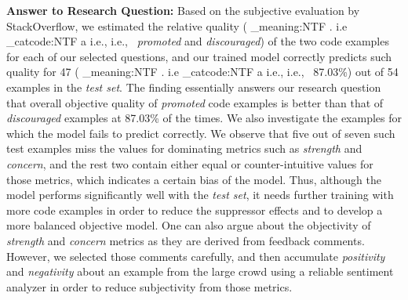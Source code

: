 \documentclass[conference]{IEEEtran}
\makeatletter
\newcommand\latinabbrev[1]{
  \peek_meaning:NTF . {%
    #1\@}%
  { \peek_catcode:NTF a {%
      #1., \@ }%
    {#1., \@}}}
\def\ie{\latinabbrev{i.e}}
\makeatother
\begin{document}
\textbf{Answer to Research Question:}
Based on the subjective evaluation by StackOverflow, we estimated the relative quality (\ie\ \emph{promoted} and \emph{discouraged}) of the two code examples for each of our selected questions, and our trained model correctly predicts such quality for 47 (\ie\ 87.03\%) out of 54 examples in the \emph{test set}.
The finding essentially answers our research question that overall objective quality of \emph{promoted} code examples is better than that of \emph{discouraged} examples at 87.03\% of the times.
We also investigate the examples for which the model fails to predict correctly. We observe that five out of seven such test examples miss the values for dominating metrics such as \emph{strength} and \emph{concern}, and the rest two contain either equal or counter-intuitive values for those metrics, which indicates a certain bias of the model. Thus, although the model performs significantly well with the \emph{test set}, it needs further training with more code examples in order to reduce the suppressor effects and to develop a more balanced objective model.
One can also argue about the objectivity of \emph{strength} and \emph{concern} metrics as they are derived from feedback comments. However, we selected those comments carefully, and then accumulate \emph{positivity} and \emph{negativity} about an example from the large crowd using a reliable sentiment analyzer \cite{sentiment} in order to reduce subjectivity from those metrics. 


\end{document}
